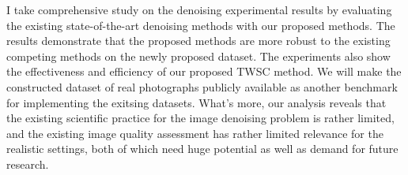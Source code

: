 I take comprehensive study on the denoising experimental results by evaluating the existing state-of-the-art denoising methods with our proposed methods. The results demonstrate that the proposed methods are more robust to the existing competing methods on the newly proposed dataset. The experiments also show the effectiveness and efficiency of our proposed TWSC method. We will make the constructed dataset of real photographs publicly available as another benchmark for implementing the exitsing datasets. What's more, our analysis reveals that the existing scientific practice for the image denoising problem is rather limited, and the existing image quality assessment has rather limited relevance for the realistic settings, both of which need huge potential as well as demand for future research.





















